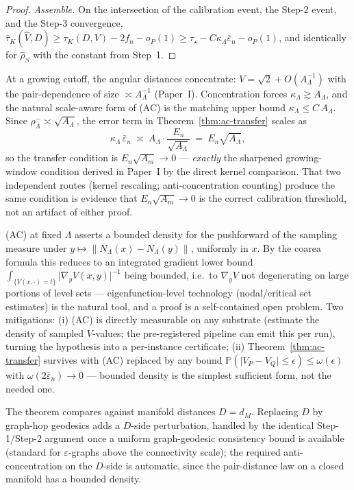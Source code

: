 \begin{proof}
\emph{Assemble.} On the intersection of the calibration event, the Step-2 event, and
the Step-3 convergence,
$\widehat\tau_K(\widehat V,D)\ge\tau_K(D,V)-2f_n-o_P(1)
\ge\tau_\star-C\kappa_\Lambda\bar\varepsilon_n-o_P(1)$, and identically for
$\widehat\rho_S$ with the constant from Step~1.
\end{proof}

\begin{remark}\label{rem:EA}
At a growing cutoff, the angular distances concentrate: $V=\sqrt2+O(A_\Lambda^{-1})$
with the pair-dependence of size $\asymp A_\Lambda^{-1}$ (Paper~I). Concentration
forces $\kappa_\Lambda\gtrsim A_\Lambda$, and the natural scale-aware form of (AC) is
the matching upper bound $\kappa_\Lambda\le C\,A_\Lambda$. Since
$\rho^-_\Lambda\asymp\sqrt{A_\Lambda}$, the error term in
Theorem~\ref{thm:ac-transfer} scales as
\[
\kappa_\Lambda\,\bar\varepsilon_n\ \asymp\ A_\Lambda\cdot\frac{E_n}{\sqrt{A_\Lambda}}
\ =\ E_n\sqrt{A_\Lambda},
\]
so the transfer condition is $E_n\sqrt{A_m}\to0$ --- \emph{exactly} the sharpened
growing-window condition derived in Paper~I by the direct kernel comparison. That two
independent routes (kernel rescaling; anti-concentration counting) produce the same
condition is evidence that $E_n\sqrt{A_m}\to0$ is the correct calibration threshold,
not an artifact of either proof.
\end{remark}

\begin{remark}[Status of (AC)]
(AC) at fixed $\Lambda$ asserts a bounded density for the pushforward of the sampling
measure under $y\mapsto\lVert N_\Lambda(x)-N_\Lambda(y)\rVert$, uniformly in $x$. By
the coarea formula this reduces to an integrated gradient lower bound
$\int_{\{V(x,\cdot)=t\}}\lvert\nabla_yV(x,y)\rvert^{-1}$ being bounded, i.e.\ to
$\nabla_yV$ not degenerating on large portions of level sets --- eigenfunction-level
technology (nodal/critical set estimates) is the natural tool, and a proof is a
self-contained open problem. Two mitigations: (i) (AC) is directly measurable on any
substrate (estimate the density of sampled $V$-values; the pre-registered pipeline can
emit this per run), turning the hypothesis into a per-instance certificate; (ii)
Theorem~\ref{thm:ac-transfer} survives with (AC) replaced by any bound
$\mathbb P(\lvert V_P-V_Q\rvert\le\epsilon)\le\omega(\epsilon)$ with
$\omega(2\bar\varepsilon_n)\to0$ --- bounded density is the simplest sufficient form,
not the needed one.
\end{remark}

\begin{remark}
The theorem compares against manifold distances $D=d_M$. Replacing $D$ by graph-hop
geodesics adds a $D$-side perturbation, handled by the identical Step-1/Step-2
argument once a uniform graph-geodesic consistency bound is available (standard for
$\varepsilon$-graphs above the connectivity scale); the required anti-concentration on
the $D$-side is automatic, since the pair-distance law on a closed manifold has a
bounded density.
\end{remark}

